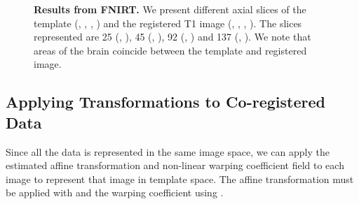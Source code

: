 \begin{figure}
{} \hspace*{-0.9em}
   \hspace*{-0.9em}
   \hspace*{-0.9em}
  \hspace*{-0.9em}
\caption{{\bf Results from FNIRT.} We present different axial slices of the template (\protect{}, \protect{}, \protect{}, \protect{}) and the registered T1 image (\protect{}, \protect{}, \protect{}, \protect{}).  The slices represented are 25 (\protect{}, \protect{}), 45 (\protect{}, \protect{}), 92 (\protect{}, \protect{}) and 137 (\protect{}, \protect{}).  We note that areas of the brain coincide between the template and registered image.}
\label{fig:fnirt_slice}
\end{figure}



\subsection{Applying Transformations to Co-registered Data}
Since all the data is represented in the same image space, we can apply the estimated affine transformation and non-linear warping coefficient field to each image to represent that image in template space.  The affine transformation must be applied with  and the warping coefficient using .  



